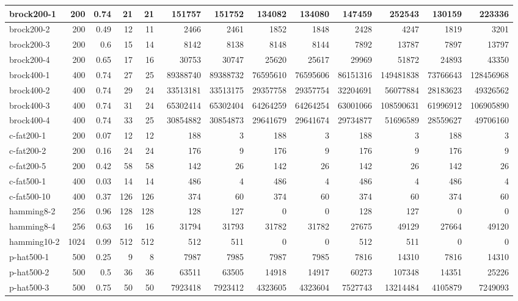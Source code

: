 \begin{table}
{\begin{tabular}{|l|r|r|r|r|r|r|r|r||r|r|r|r|}
brock200-1 & 200 & 0.74 & 21 & 21 & 151757 & 151752 & 134082 & 134080 & 147459 & 252543 & 130159 & 223336 \\ \hline
brock200-2 & 200 & 0.49 & 12 & 11 & 2466 & 2461 & 1852 & 1848 & 2428 & 4247 & 1819 & 3201 \\ \hline
brock200-3 & 200 & 0.6 & 15 & 14 & 8142 & 8138 & 8148 & 8144 & 7892 & 13787 & 7897 & 13797 \\ \hline
brock200-4 & 200 & 0.65 & 17 & 16 & 30753 & 30747 & 25620 & 25617 & 29969 & 51872 & 24893 & 43350 \\ \hline
brock400-1 & 400 & 0.74 & 27 & 25 & 89388740 & 89388732 & 76595610 & 76595606 & 86151316 & 149481838 & 73766643 & 128456968 \\ \hline
brock400-2 & 400 & 0.74 & 29 & 24 &  33513181 & 33513175 & 29357758 & 29357754 & 32204691 & 56077884 & 28183623 & 49326562 \\ \hline
brock400-3 & 400 & 0.74 & 31 & 24 & 65302414 & 65302404 & 64264259 & 64264254 & 63001066 & 108590631 & 61996912 & 106905890 \\ \hline
brock400-4 & 400 & 0.74 & 33 & 25 & 30854882 & 30854873 & 29641679 & 29641674 & 29734877 & 51696589 & 28559627 & 49706160 \\ \hline
c-fat200-1 & 200 & 0.07 & 12 & 12 & 188 & 3 & 188 & 3 & 188 & 3 & 188 & 3 \\ \hline
c-fat200-2 & 200 & 0.16 & 24 & 24 & 176 & 9 & 176 & 9 & 176 & 9 & 176 & 9 \\ \hline
c-fat200-5 & 200 & 0.42 & 58 & 58 & 142 & 26 & 142 & 26 & 142 & 26 & 142 & 26 \\ \hline
c-fat500-1 & 400 & 0.03 & 14 & 14 & 486 & 4 & 486 & 4 & 486 & 4 & 486 & 4 \\ \hline
c-fat500-10 & 400 & 0.37 & 126 & 126 & 374 & 60 & 374 & 60 & 374 & 60 & 374 & 60 \\ \hline
hamming8-2 & 256 & 0.96 & 128 & 128 & 128 & 127 & 0 & 0 & 128 & 127 & 0 & 0 \\ \hline
hamming8-4 & 256 & 0.63 & 16 & 16 & 31794 & 31793 & 31782 & 31782 & 27675 & 49129 & 27664 & 49120 \\ \hline
hamming10-2 & 1024 & 0.99 & 512 & 512 & 512 & 511 & 0 & 0 & 512 & 511 & 0 & 0 \\ \hline
p-hat500-1 & 500 & 0.25 & 9 & 8 & 7987 & 7985 & 7987 & 7985 & 7816 & 14310 & 7816 & 14310 \\ \hline
p-hat500-2 & 500 & 0.5 & 36 & 36 & 63511 & 63505 & 14918 & 14917 & 60273 & 107348 & 14351 & 25226 \\ \hline
p-hat500-3 & 500 & 0.75 & 50 & 50 & 7923418 & 7923412 & 4323605 & 4323604 & 7527743 & 13214484 & 4105879 & 7249093 \\ \hline

\end{tabular}}
\end{table}
